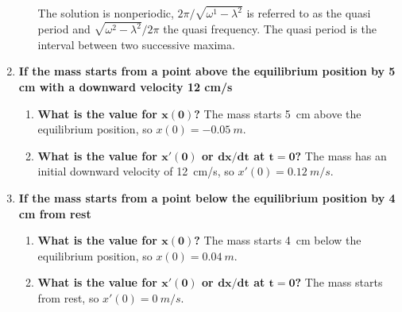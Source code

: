 \documentclass[12pt]{article}
\begin{document}
\begin{enumerate}
\begin{enumerate}
            The solution is nonperiodic, \(2\pi/\sqrt{\omega^1 - \lambda^2}\) is referred to as the quasi period and \(\sqrt{\omega^2 - \lambda^2}/2\pi\) the quasi frequency. The quasi period is the interval between two successive maxima.
      \end{enumerate}
    \item \textbf{If the mass starts from a point above the equilibrium position by 5 cm with a downward velocity 12 cm/s}
      \begin{enumerate}[\bfseries a.]
        \item \textbf{What is the value for \(\bm{x(0)}\)?}
          The mass starts \SI{5}{cm} above the equilibrium position, so \(x(0) = \SI{-0.05}{m}\).
        \item \textbf{What is the value for \(\bm{x'(0)}\) or \(\bm{\text{d}x/\text{d}t}\) at \(\bm{t = 0}\)?}
          The mass has an initial downward velocity of \SI{12}{cm/s}, so \(x'(0) = \SI{0.12}{m/s}\).
      \end{enumerate}
    \item \textbf{If the mass starts from a point below the equilibrium position by 4 cm from rest}
      \begin{enumerate}[\bfseries a.]
        \item \textbf{What is the value for \(\bm{x(0)}\)?}
          The mass starts \SI{4}{cm} below the equilibrium position, so \(x(0) = \SI{0.04}{m}\).
        \item \textbf{What is the value for \(\bm{x'(0)}\) or \(\bm{\text{d}x/\text{d}t}\) at \(\bm{t = 0}\)?}
          The mass starts from rest, so \(x'(0) = \SI{0}{m/s}\).
      \end{enumerate}
  \end{enumerate}
\end{document}
